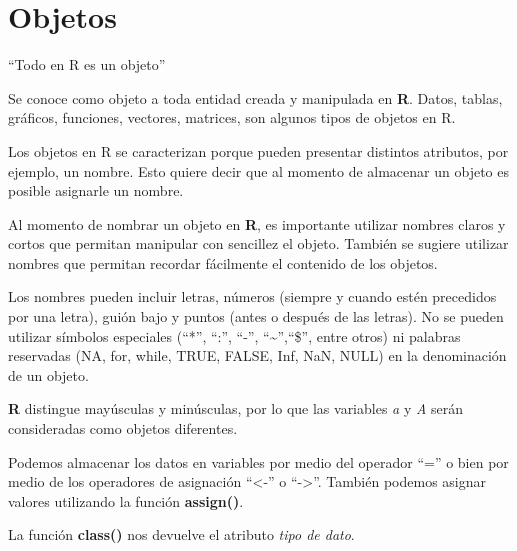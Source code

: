 \documentclass[
  spanish,
  letterpaper,
  DIV=11,
  numbers=noendperiod]{scrreprt}
\begin{document}
\section{Objetos}\label{objetos}

``Todo en R es un objeto''

Se conoce como objeto a toda entidad creada y manipulada en \textbf{R}.
Datos, tablas, gráficos, funciones, vectores, matrices, son algunos
tipos de objetos en R.

Los objetos en R se caracterizan porque pueden presentar distintos
atributos, por ejemplo, un nombre. Esto quiere decir que al momento de
almacenar un objeto es posible asignarle un nombre.

\begin{tcolorbox}[enhanced jigsaw, arc=.35mm, bottomrule=.15mm, bottomtitle=1mm, breakable, colback=white, colbacktitle=quarto-callout-note-color!10!white, colframe=quarto-callout-note-color-frame, coltitle=black, left=2mm, leftrule=.75mm, opacityback=0, opacitybacktitle=0.6, rightrule=.15mm, title=\textcolor{quarto-callout-note-color}{\faInfo}\hspace{0.5em}{\textbf{Nota}}, titlerule=0mm, toprule=.15mm, toptitle=1mm]

Al momento de nombrar un objeto en \textbf{R}, es importante utilizar
nombres claros y cortos que permitan manipular con sencillez el objeto.
También se sugiere utilizar nombres que permitan recordar fácilmente el
contenido de los objetos.

Los nombres pueden incluir letras, números (siempre y cuando estén
precedidos por una letra), guión bajo y puntos (antes o después de las
letras). No se pueden utilizar símbolos especiales (``*'', ``:'', ``-'',
``\textasciitilde{}'',``\$'', entre otros) ni palabras reservadas (NA,
for, while, TRUE, FALSE, Inf, NaN, NULL) en la denominación de un
objeto.

\textbf{R} distingue mayúsculas y minúsculas, por lo que las variables
\emph{a} y \emph{A} serán consideradas como objetos diferentes.

\end{tcolorbox}

Podemos almacenar los datos en variables por medio del operador ``='' o
bien por medio de los operadores de asignación ``\textless-'' o
``-\textgreater{}''. También podemos asignar valores utilizando la
función \textbf{assign()}.

La función \textbf{class()} nos devuelve el atributo \emph{tipo de
dato}.
\end{document}
